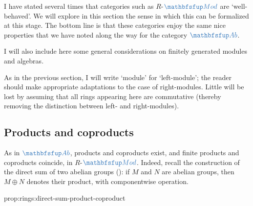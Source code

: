 I have stated several times that categories such as $R$-$\categ{Mod}$
are `well-behaved'. We will explore in this section the sense in which
this can be formalized at this stage. The bottom line is that these
categories enjoy the same nice properties that we have noted along the
way for the category $\categ{Ab}$.

I will also include here some general considerations on finitely
generated modules and algebras.

As in the previous section, I will write `module' for `left-module';
the reader should make appropriate adaptations to the case of
right-modules. Little will be lost by assuming that all rings
appearing here are commutative (thereby removing the distinction
between left- and right-modules).

\subsection{Products and coproducts}
\label{subsec:rings:products-and-coproducts}
As in $\categ{Ab}$, products and coproducts exist, and finite products
and coproducts coincide, in $R$-$\categ{Mod}$. Indeed, recall the
construction of the direct sum of two abelian groups
(): if $M$ and $N$ are abelian
groups, then $M \oplus N$ denotes their product, with componentwise
operation. 
\begin{prop}{}{prop:rings:direct-sum-product-coproduct}
\end{prop}

